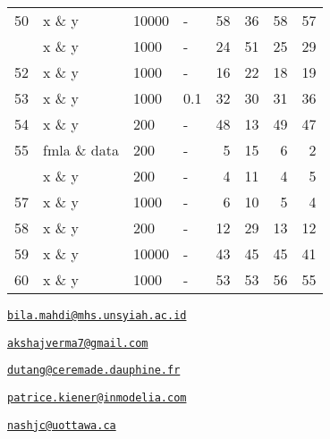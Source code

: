 \begin{Schunk}
\begin{tabular}{rlllrrrr}
50 & x \& y & 10000 & - & 58 & 36 & 58 & 57\\
\addlinespace
51 & x \& y & 1000 & - & 24 & 51 & 25 & 29\\
52 & x \& y & 1000 & - & 16 & 22 & 18 & 19\\
53 & x \& y & 1000 & 0.1 & 32 & 30 & 31 & 36\\
54 & x \& y & 200 & - & 48 & 13 & 49 & 47\\
55 & fmla \& data & 200 & - & 5 & 15 & 6 & 2\\
\addlinespace
56 & x \& y & 200 & - & 4 & 11 & 4 & 5\\
57 & x \& y & 1000 & - & 6 & 10 & 5 & 4\\
58 & x \& y & 200 & - & 12 & 29 & 13 & 12\\
59 & x \& y & 10000 & - & 43 & 45 & 45 & 41\\
60 & x \& y & 1000 & - & 53 & 53 & 56 & 55\\
\bottomrule
\end{tabular}

\end{Schunk}


\address{%
Salsabila Mahdi\\
Universitas Syiah Kuala\\
JL. Syech Abdurrauf No.3, Aceh 23111, Indonesia\\
}
\href{mailto:bila.mahdi@mhs.unsyiah.ac.id}{\nolinkurl{bila.mahdi@mhs.unsyiah.ac.id}}

\address{%
Akshaj Verma\\
Manipal Institute of Technology\\
Manipal, Karnataka, 576104, India\\
}
\href{mailto:akshajverma7@gmail.com}{\nolinkurl{akshajverma7@gmail.com}}

\address{%
Christophe Dutang\\
University Paris-Dauphine, University PSL, CNRS, CEREMADE\\
Place du Maréchal de Lattre de Tassigny, 75016 Paris, France\\
}
\href{mailto:dutang@ceremade.dauphine.fr}{\nolinkurl{dutang@ceremade.dauphine.fr}}

\address{%
Patrice Kiener\\
InModelia\\
5 rue Malebranche, 75005 Paris, France\\
}
\href{mailto:patrice.kiener@inmodelia.com}{\nolinkurl{patrice.kiener@inmodelia.com}}

\address{%
John C. Nash\\
Telfer School of Management, University of Ottawa\\
55 Laurier Avenue East, Ottawa, Ontario K1N 6N5 Canada\\
}
\href{mailto:nashjc@uottawa.ca}{\nolinkurl{nashjc@uottawa.ca}}

